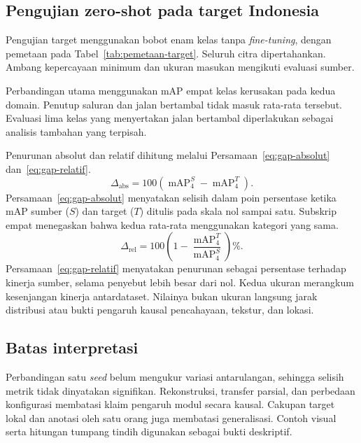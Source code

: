 \subsection{Pengujian zero-shot pada target Indonesia}
Pengujian target menggunakan bobot enam kelas tanpa \textit{fine-tuning}, dengan pemetaan pada Tabel~\ref{tab:pemetaan-target}. Seluruh citra dipertahankan. Ambang kepercayaan minimum dan ukuran masukan mengikuti evaluasi sumber.

Perbandingan utama menggunakan mAP empat kelas kerusakan pada kedua domain. Penutup saluran dan jalan bertambal tidak masuk rata-rata tersebut. Evaluasi lima kelas yang menyertakan jalan bertambal diperlakukan sebagai analisis tambahan yang terpisah.

Penurunan absolut dan relatif dihitung melalui Persamaan~\eqref{eq:gap-absolut} dan~\eqref{eq:gap-relatif}.
\begin{equation}
\Delta_{\mathrm{abs}}=100\left(\operatorname{mAP}^{S}_{4}-\operatorname{mAP}^{T}_{4}\right).
\label{eq:gap-absolut}
\end{equation}
Persamaan~\eqref{eq:gap-absolut} menyatakan selisih dalam poin persentase ketika mAP sumber ($S$) dan target ($T$) ditulis pada skala nol sampai satu. Subskrip empat menegaskan bahwa kedua rata-rata menggunakan kategori yang sama.
\begin{equation}
\Delta_{\mathrm{rel}}=100\left(1-\frac{\operatorname{mAP}^{T}_{4}}{\operatorname{mAP}^{S}_{4}}\right)\%.
\label{eq:gap-relatif}
\end{equation}
Persamaan~\eqref{eq:gap-relatif} menyatakan penurunan sebagai persentase terhadap kinerja sumber, selama penyebut lebih besar dari nol. Kedua ukuran merangkum kesenjangan kinerja antardataset. Nilainya bukan ukuran langsung jarak distribusi atau bukti pengaruh kausal pencahayaan, tekstur, dan lokasi.

\subsection{Batas interpretasi}
Perbandingan satu \textit{seed} belum mengukur variasi antarulangan, sehingga selisih metrik tidak dinyatakan signifikan. Rekonstruksi, transfer parsial, dan perbedaan konfigurasi membatasi klaim pengaruh modul secara kausal. Cakupan target lokal dan anotasi oleh satu orang juga membatasi generalisasi. Contoh visual serta hitungan tumpang tindih digunakan sebagai bukti deskriptif.
